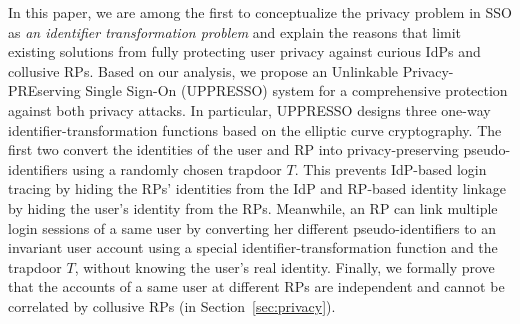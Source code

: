 In this paper, we are among the first to conceptualize the privacy problem in SSO as {\em an identifier transformation problem} and explain the reasons that limit existing solutions from fully protecting user privacy against curious IdPs and collusive RPs. Based on our analysis, we propose an Unlinkable Privacy-PREserving Single Sign-On (UPPRESSO) system for a comprehensive protection against both privacy attacks. In particular, UPPRESSO designs three one-way identifier-transformation functions based on the elliptic curve cryptography. The first two convert the identities of the user and RP into privacy-preserving pseudo-identifiers using a randomly chosen trapdoor $T$. This prevents IdP-based login tracing by hiding the RPs' identities from the IdP and RP-based identity linkage by hiding the user's identity from the RPs. Meanwhile, an RP can link multiple login sessions of a same user by converting her different pseudo-identifiers to an invariant user account using a special identifier-transformation function and the trapdoor $T$, without knowing the user's real identity. Finally, we formally prove that the accounts of a same user at different RPs are independent and cannot be correlated by collusive RPs (in Section~\ref{sec:privacy}). 
